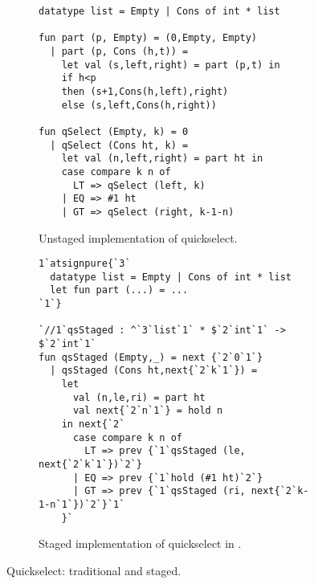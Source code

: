 
\begin{figure*}
\begin{subfigure}{0.5\textwidth}
\begin{lstlisting} 
datatype list = Empty | Cons of int * list

fun part (p, Empty) = (0,Empty, Empty) 
  | part (p, Cons (h,t)) = 
    let val (s,left,right) = part (p,t) in 
    if h<p 
    then (s+1,Cons(h,left),right) 
    else (s,left,Cons(h,right))

fun qSelect (Empty, k) = 0
  | qSelect (Cons ht, k) =
    let val (n,left,right) = part ht in
    case compare k n of
      LT => qSelect (left, k)
    | EQ => #1 ht
    | GT => qSelect (right, k-1-n)
\end{lstlisting}
\caption{Unstaged implementation of quickselect.}
\label{fig:qs-unstaged}
\end{subfigure}%
\begin{subfigure}{0.5\textwidth}
\begin{lstlisting} 
1`atsignpure{`3`
  datatype list = Empty | Cons of int * list
  let fun part (...) = ...
`1`} 

`//1`qsStaged : ^`3`list`1` * $`2`int`1` -> $`2`int`1`
fun qsStaged (Empty,_) = next {`2`0`1`}
  | qsStaged (Cons ht,next{`2`k`1`}) = 
    let 
      val (n,le,ri) = part ht
      val next{`2`n`1`} = hold n 
    in next{`2`
      case compare k n of
        LT => prev {`1`qsStaged (le, next{`2`k`1`})`2`}
      | EQ => prev {`1`hold (#1 ht)`2`}
      | GT => prev {`1`qsStaged (ri, next{`2`k-1-n`1`})`2`}`1`
    }`
\end{lstlisting}
\caption{Staged implementation of quickselect in \lang.}
\vspace{1.3em}
\label{fig:qs-staged}
\end{subfigure}
\caption{Quickselect: traditional and staged.}
\end{figure*}


